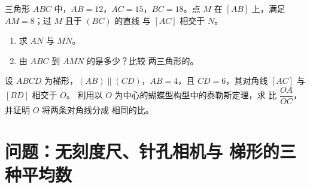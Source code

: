 \begin{exercise}[$\star\star$]\label{exo:g9:thales:8}
三角形 $ABC$ 中，$AB = 12$，$AC = 15$，$BC = 18$。点 $M$ 在
$[AB]$ 上，满足 $AM = 8$；过 $M$ 且于 $(BC)$ 的直线
与 $[AC]$ 相交于 $N$。
\begin{enumerate}
  \item 求 $AN$ 与 $MN$。
  \item 由 $ABC$ 到 $AMN$ 的是多少？比较
        两三角形的。
\end{enumerate}
\end{exercise}

\begin{exercise}[$\star\star\star$]\label{exo:g9:thales:9}
设 $ABCD$ 为梯形，$(AB) \parallel (CD)$，$AB = 4$，且
$CD = 6$，其对角线 $[AC]$ 与 $[BD]$ 相交于 $O$。
利用以 $O$ 为中心的蝴蝶型构型中的泰勒斯定理，求
比 $\dfrac{OA}{OC}$，并证明 $O$ 将两条对角线分成
相同的比。
\end{exercise}

\section{问题：无刻度尺、针孔相机与
梯形的三种平均数}

